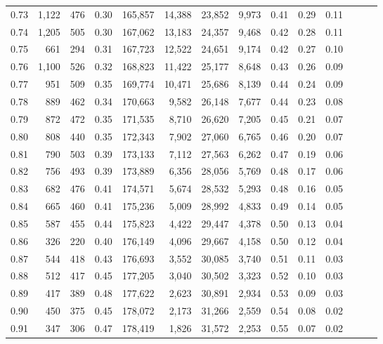 \begin{tabular}{rrrrrrrrrrrrrr}
0.73 &  1,122 &  476 &  0.30 &  165,857 &   14,388 &  23,852 &   9,973 &  0.41 &  0.29 &      0.11 \\
0.74 &  1,205 &  505 &  0.30 &  167,062 &   13,183 &  24,357 &   9,468 &  0.42 &  0.28 &      0.11 \\
0.75 &    661 &  294 &  0.31 &  167,723 &   12,522 &  24,651 &   9,174 &  0.42 &  0.27 &      0.10 \\
0.76 &  1,100 &  526 &  0.32 &  168,823 &   11,422 &  25,177 &   8,648 &  0.43 &  0.26 &      0.09 \\
0.77 &    951 &  509 &  0.35 &  169,774 &   10,471 &  25,686 &   8,139 &  0.44 &  0.24 &      0.09 \\
0.78 &    889 &  462 &  0.34 &  170,663 &    9,582 &  26,148 &   7,677 &  0.44 &  0.23 &      0.08 \\
0.79 &    872 &  472 &  0.35 &  171,535 &    8,710 &  26,620 &   7,205 &  0.45 &  0.21 &      0.07 \\
0.80 &    808 &  440 &  0.35 &  172,343 &    7,902 &  27,060 &   6,765 &  0.46 &  0.20 &      0.07 \\
0.81 &    790 &  503 &  0.39 &  173,133 &    7,112 &  27,563 &   6,262 &  0.47 &  0.19 &      0.06 \\
0.82 &    756 &  493 &  0.39 &  173,889 &    6,356 &  28,056 &   5,769 &  0.48 &  0.17 &      0.06 \\
0.83 &    682 &  476 &  0.41 &  174,571 &    5,674 &  28,532 &   5,293 &  0.48 &  0.16 &      0.05 \\
0.84 &    665 &  460 &  0.41 &  175,236 &    5,009 &  28,992 &   4,833 &  0.49 &  0.14 &      0.05 \\
0.85 &    587 &  455 &  0.44 &  175,823 &    4,422 &  29,447 &   4,378 &  0.50 &  0.13 &      0.04 \\
0.86 &    326 &  220 &  0.40 &  176,149 &    4,096 &  29,667 &   4,158 &  0.50 &  0.12 &      0.04 \\
0.87 &    544 &  418 &  0.43 &  176,693 &    3,552 &  30,085 &   3,740 &  0.51 &  0.11 &      0.03 \\
0.88 &    512 &  417 &  0.45 &  177,205 &    3,040 &  30,502 &   3,323 &  0.52 &  0.10 &      0.03 \\
0.89 &    417 &  389 &  0.48 &  177,622 &    2,623 &  30,891 &   2,934 &  0.53 &  0.09 &      0.03 \\
0.90 &    450 &  375 &  0.45 &  178,072 &    2,173 &  31,266 &   2,559 &  0.54 &  0.08 &      0.02 \\
0.91 &    347 &  306 &  0.47 &  178,419 &    1,826 &  31,572 &   2,253 &  0.55 &  0.07 &      0.02 \\

\end{tabular}
